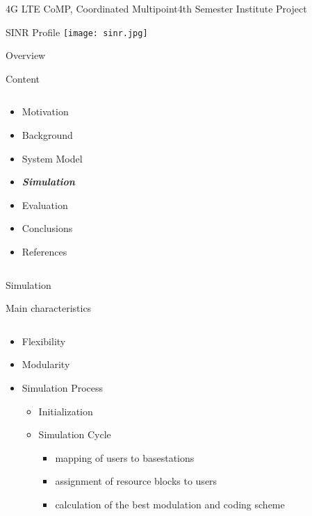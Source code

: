 \documentclass[xcolor={cmyk}]{beamer}
\begin{document}
  \begin{frame}{4G LTE CoMP, Coordinated Multipoint}{4th Semester Institute Project}
	 \begin{block}{SINR Profile}
		 \texttt{[image: sinr.jpg]}
	 \end{block}
 \end{frame}
 
\begin{frame}{Overview}
	\begin{block}{Content}
		\begin{columns}
			\begin{column}{.9\textwidth}
				\begin{itemize}
					\item Motivation
					\item Background
					\item System Model
					\item \textbf{\emph{Simulation}}
					\item Evaluation
					\item Conclusions
					\item References
				\end{itemize}
			\end{column}
		\end{columns}
	\end{block}
\end{frame}

 \begin{frame}{Simulation}
	 \begin{block}{Main characteristics}
	 	\begin{columns}
			\begin{column}{.9\textwidth}
				\begin{itemize}
					\item Flexibility
					\item Modularity
					\item Simulation Process
					\begin{itemize}
						\item Initialization
						\item Simulation Cycle
						\begin{itemize}
							\item mapping of users to basestations
							\item assignment of resource blocks to users
							\item calculation of the best modulation and coding scheme
					 	\end{itemize}
					 \end{itemize}
					
				 \end{itemize}
			\end{column}
		\end{columns}
	 \end{block}
 \end{frame}
 
\end{document}
